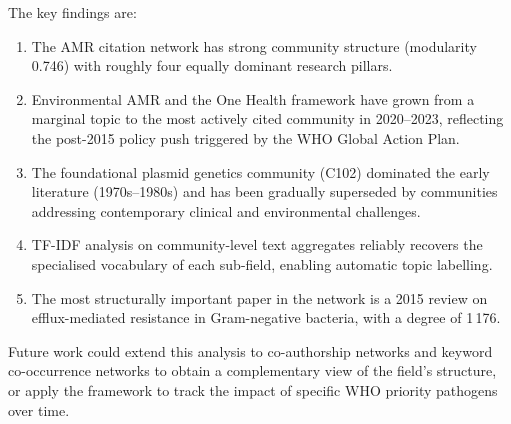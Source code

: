\documentclass[12pt,a4paper]{article}
\begin{document}
The key findings are:
\begin{enumerate}
    \item The AMR citation network has strong community structure (modularity 0.746)
          with roughly four equally dominant research pillars.
    \item Environmental AMR and the One Health framework have grown from a marginal
          topic to the most actively cited community in 2020--2023, reflecting the
          post-2015 policy push triggered by the WHO Global Action Plan.
    \item The foundational plasmid genetics community (C102) dominated the early
          literature (1970s--1980s) and has been gradually superseded by communities
          addressing contemporary clinical and environmental challenges.
    \item TF-IDF analysis on community-level text aggregates reliably recovers the
          specialised vocabulary of each sub-field, enabling automatic topic labelling.
    \item The most structurally important paper in the network is a 2015 review on
          efflux-mediated resistance in Gram-negative bacteria, with a degree of 1\,176.
\end{enumerate}

Future work could extend this analysis to co-authorship networks and keyword co-occurrence
networks to obtain a complementary view of the field's structure,
or apply the framework to track the impact of specific WHO priority pathogens over time.
\end{document}
